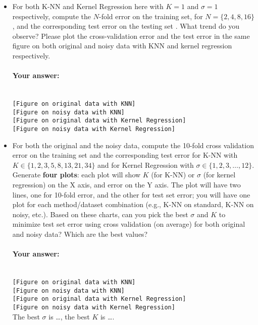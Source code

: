 \documentclass[english]{article}
\begin{document}
\begin{itemize}
\item For both K-NN and Kernel Regression here with $K = 1$ and $\sigma = 1$ respectively, compute the  $N$-fold error on the training set, for $N = \{2, 4, 8, 16\}$, and the corresponding test error on the testing set .  What trend do you observe? Please plot the cross-validation error and the test error in the same figure on both original and noisy data with KNN and kernel regression respectively.

 
 \paragraph{Your answer:}
 ~\\
 
 {\tt  [Figure on original data with KNN]}
 \\    
 
 {\tt [Figure on noisy data with KNN]}
 \\

  {\tt  [Figure on original data with Kernel Regression]}
 \\    
 
  {\tt  [Figure on noisy data with Kernel Regression]}
 \\    
 
\item For both the original and the noisy data, compute the
  10-fold cross validation error on the training set and the corresponding test error for K-NN with
  $K \in \{1, 2, 3, 5, 8, 13, 21, 34\}$ and for Kernel Regression with $\sigma \in \{1, 2, 3,\ldots, 12\}$.  Generate {\bf
    four plots}: each plot will show $K$ (for K-NN) or $\sigma$ (for
  kernel regression) on the X axis, and error on the Y axis. The plot
  will have two lines, one for 10-fold error, and the
  other for test set error; you will have one plot for each
  method/dataset combination (e.g., K-NN on standard, K-NN on noisy,
  etc.). Based on these charts, can you pick the best $\sigma$ and $K$
  to minimize test set error using cross validation (on average) for both original and noisy data? Which are the best values? 
  
\paragraph{Your answer:}
 ~\\
 
 {\tt  [Figure on original data with KNN]}
 \\    
 
 {\tt [Figure on noisy data with KNN]}
 \\

  {\tt  [Figure on original data with Kernel Regression]}
 \\    
 
  {\tt  [Figure on noisy data with Kernel Regression]}
 \\    
 
 The best $\sigma$ is  \ldots, the best $K$ is \ldots  .


\end{itemize}
\end{document}
